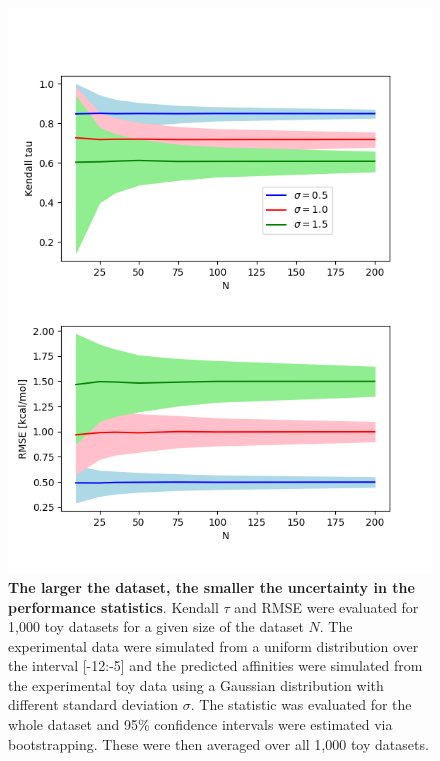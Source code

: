 \documentclass[9pt,bestpractices]{livecoms}
\begin{document}
\begin{figure}
    \centering
    \includegraphics[width=0.95\linewidth]{figures/N-CI.png}
    \caption{\textbf{The larger the dataset, the smaller the uncertainty in the performance statistics}. Kendall $\tau$ and RMSE were evaluated for 1,000 toy datasets for a given size of the dataset $N$. The experimental data were simulated from a uniform distribution over the interval [-12:-5] and the predicted affinities were simulated from the experimental toy data using a Gaussian distribution with different standard deviation $\sigma$. The statistic was evaluated for the whole dataset and 95\% confidence intervals were estimated via bootstrapping. These were then averaged over all 1,000 toy datasets.}
    \label{fig:N_CI}
\end{figure}

 
\end{document}
